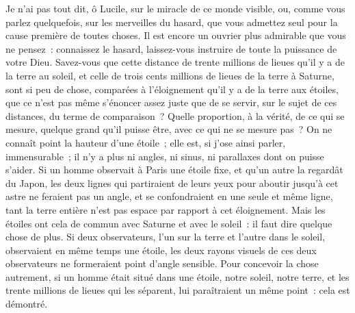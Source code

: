 \documentclass[french,twoside]{book} %
\begin{document}
Je n’ai pas tout dit, ô Lucile, sur le miracle de ce monde visible, ou, comme vous parlez quelquefois, sur les merveilles du hasard, que vous admettez seul pour la cause première de toutes choses. Il est encore un ouvrier plus admirable que vous ne pensez : connaissez le hasard, laissez-vous instruire de toute la puissance de votre Dieu. Savez-vous que cette distance de trente millions de lieues qu’il y a de la terre au soleil, et celle de trois cents millions de lieues de la terre à Saturne, sont si peu de chose, comparées à l’éloignement qu’il y a de la terre aux étoiles, que ce n’est pas même s’énoncer assez juste que de se servir, sur le sujet de ces distances, du terme de comparaison ? Quelle proportion, à la vérité, de ce qui se mesure, quelque grand qu’il puisse être, avec ce qui ne se mesure pas ? On ne connaît point la hauteur d’une étoile ; elle est, si j’ose ainsi parler, immensurable ; il n’y a plus ni angles, ni sinus, ni parallaxes dont on puisse s’aider. Si un homme observait à Paris une étoile fixe, et qu’un autre la regardât du Japon, les deux lignes qui partiraient de leurs yeux pour aboutir jusqu’à cet astre ne feraient pas un angle, et se confondraient en une seule et même ligne, tant la terre entière n’est pas espace par rapport à cet éloignement. Mais les étoiles ont cela de commun avec Saturne et avec le soleil : il faut dire quelque chose de plus. Si deux observateurs, l’un sur la terre et l’autre dans le soleil, observaient en même temps une étoile, les deux rayons visuels de ces deux observateurs ne formeraient point d’angle sensible. Pour concevoir la chose autrement, si un homme était situé dans une étoile, notre soleil, notre terre, et les trente millions de lieues qui les séparent, lui paraîtraient un même point : cela est démontré.\par
\end{document}

